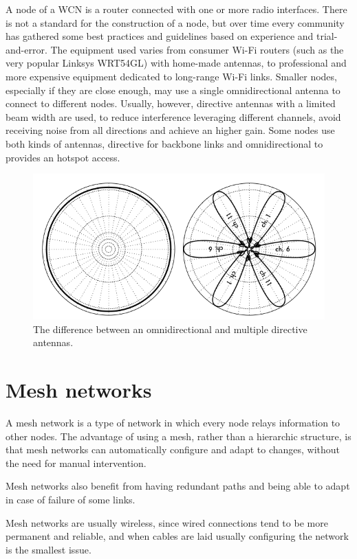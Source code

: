 \documentclass[oneside,openany]{memoir}
\begin{document}
A node of a WCN is a router connected with one or more radio interfaces.
There is not a standard for the construction of a node, but over time
every community has gathered some best practices and guidelines based on
experience and trial-and-error. The equipment used varies from consumer
Wi-Fi routers (such as the very popular Linksys WRT54GL) with home-made
antennas, to professional and more expensive equipment dedicated to
long-range Wi-Fi links. Smaller nodes, especially if they are close enough,
may use a single omnidirectional antenna to connect to
different nodes. Usually, however, directive antennas with a limited
beam width are used, to reduce interference leveraging different
channels, avoid receiving noise from all directions and achieve an
higher gain. Some nodes use both kinds of antennas, directive for
backbone links and omnidirectional to provides an hotspot access.

\begin{figure}[htbp]
\centering
\includegraphics{./images/directional-antennas.png}
\caption{The difference between an omnidirectional and multiple
directive antennas.}
\end{figure}

\section{Mesh networks}\label{mesh-networks}
A mesh network is a type of network in which every node relays information
to other nodes. The advantage of using a mesh, rather than a
hierarchic structure, is that mesh networks can automatically configure
and adapt to changes, without the need for manual intervention.

Mesh networks also benefit from having redundant paths and being able to
adapt in case of failure of some links.

Mesh networks are usually wireless, since wired connections tend to be
more permanent and reliable, and when cables are laid usually configuring
the network is the smallest issue.
\end{document}
